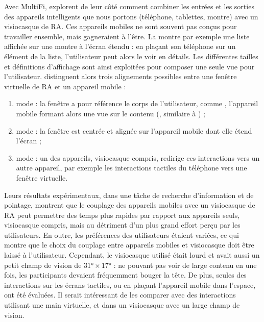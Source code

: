 Avec MultiFi, \cite{Grubert2015} explorent de leur côté comment combiner les entrées et les sorties des appareils intelligents que nous portons (téléphone, tablettes, montre) avec un visiocasque de RA. Ces appareils mobiles ne sont souvent pas conçus pour travailler ensemble, mais gagneraient à l'être. La  montre par exemple une liste affichée sur une montre à l'écran étendu : en plaçant son téléphone sur un élément de la liste, l'utilisateur peut alors le voir en détails. Les différentes tailles et définitions d'affichage sont ainsi exploitées pour composer une seule vue pour l'utilisateur. \citeauthor{Grubert2015} distinguent alors trois alignements possibles entre une fenêtre virtuelle de RA et un appareil mobile  :
\begin{enumerate}
  \item mode  : la fenêtre a pour référence le corps de l'utilisateur, comme \cite{Ens2014}, l'appareil mobile formant alors une vue  sur le contenu (, similaire à \cite{Berge2014}) ;
  \item mode  : la fenêtre est centrée et alignée sur l'appareil mobile dont elle étend l'écran  ;
  \item mode  : un des appareils, visiocasque compris, redirige ces interactions vers un autre appareil, par exemple les interactions tactiles du téléphone vers une fenêtre virtuelle.
\end{enumerate}
\medskip


Leurs résultats expérimentaux, dans une tâche de recherche d'information et de pointage, montrent que le couplage des appareils mobiles avec un visiocasque de RA peut permettre des temps plus rapides par rapport aux appareils seuls, visiocasque compris, mais au détriment d'un plus grand effort perçu par les utilisateurs. En outre, les préférences des utilisateurs étaient variées, ce qui montre que le choix du couplage entre appareils mobiles et visiocasque doit être laissé à l'utilisateur. Cependant, le visiocasque utilisé était lourd et avait aussi un petit champ de vision de $\ang{31} \times \ang{17}$ : ne pouvant pas voir de large contenu en une fois, les participants devaient fréquemment bouger la tête. De plus, seules des interactions sur les écrans tactiles, ou en plaçant l'appareil mobile dans l'espace, ont été évaluées. Il serait intéressant de les comparer avec des interactions utilisant une main virtuelle, et dans un visiocasque avec un large champ de vision.

